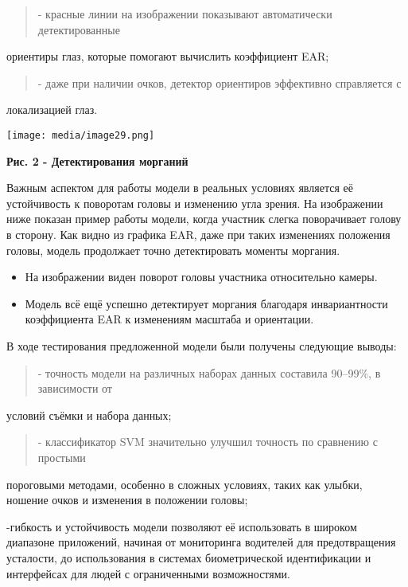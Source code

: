 \documentclass[
]{article}
\begin{document}
\begin{quote}
- красные линии на изображении показывают автоматически детектированные
\end{quote}

ориентиры глаз, которые помогают вычислить коэффициент EAR;

\begin{quote}
- даже при наличии очков, детектор ориентиров эффективно справляется с
\end{quote}

локализацией глаз.

\texttt{[image: media/image29.png]}

\textbf{Рис. 2 - Детектирования морганий}

Важным аспектом для работы модели в реальных условиях является её
устойчивость к поворотам головы и изменению угла зрения. На изображении
ниже показан пример работы модели, когда участник слегка поворачивает
голову в сторону. Как видно из графика EAR, даже при таких изменениях
положения головы, модель продолжает точно детектировать моменты
моргания.

\begin{itemize}
\item
  На изображении виден поворот головы участника относительно камеры.
\item
  Модель всё ещё успешно детектирует моргания благодаря инвариантности
  коэффициента EAR к изменениям масштаба и ориентации.
\end{itemize}

В ходе тестирования предложенной модели были получены следующие выводы:

\begin{quote}
- точность модели на различных наборах данных составила 90--99\%, в
зависимости от
\end{quote}

условий съёмки и набора данных;

\begin{quote}
- классификатор SVM значительно улучшил точность по сравнению с простыми
\end{quote}

пороговыми методами, особенно в сложных условиях, таких как улыбки,
ношение очков и изменения в положении головы;

-гибкость и устойчивость модели позволяют её использовать в широком
диапазоне приложений, начиная от мониторинга водителей для
предотвращения усталости, до использования в системах биометрической
идентификации и интерфейсах для людей с ограниченными возможностями.
\end{document}
